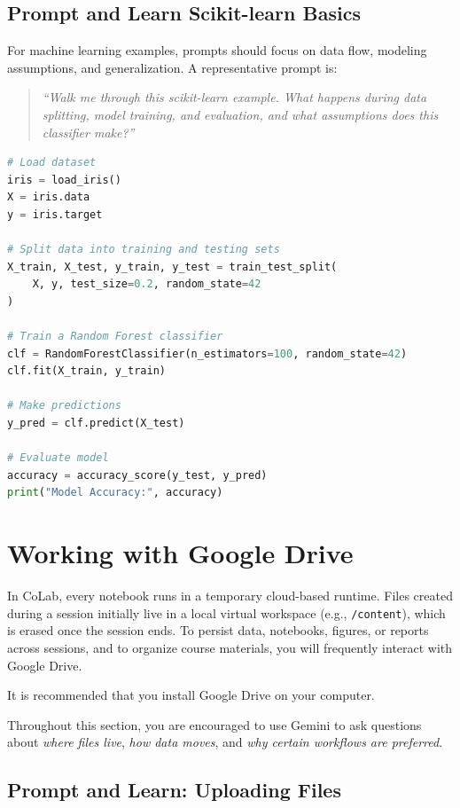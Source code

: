\documentclass[12pt]{article}
\begin{document}
\subsection*{Prompt and Learn Scikit-learn Basics}

For machine learning examples, prompts should focus on data flow, modeling assumptions, and generalization.  
A representative prompt is:

\begin{quote}
\emph{``Walk me through this scikit-learn example. What happens during data splitting, model training, and evaluation, and what assumptions does this classifier make?''}
\end{quote}

\begin{lstlisting}[language=Python]
# Load dataset
iris = load_iris()
X = iris.data
y = iris.target

# Split data into training and testing sets
X_train, X_test, y_train, y_test = train_test_split(
    X, y, test_size=0.2, random_state=42
)

# Train a Random Forest classifier
clf = RandomForestClassifier(n_estimators=100, random_state=42)
clf.fit(X_train, y_train)

# Make predictions
y_pred = clf.predict(X_test)

# Evaluate model
accuracy = accuracy_score(y_test, y_pred)
print("Model Accuracy:", accuracy)
\end{lstlisting}

\section*{Working with Google Drive}

In CoLab, every notebook runs in a temporary cloud-based runtime. Files created during a session initially live in a local virtual  workspace (e.g., \texttt{/content}), which is erased once the session ends. To persist data, notebooks, figures, or reports across sessions, and to organize course materials, you will frequently interact with Google Drive.

It is recommended that you install Google Drive on your computer. 

Throughout this section, you are encouraged to use Gemini to ask questions about \emph{where files live}, \emph{how data moves}, and \emph{why certain workflows are preferred}.

\subsection*{Prompt and Learn: Uploading Files}
\end{document}
